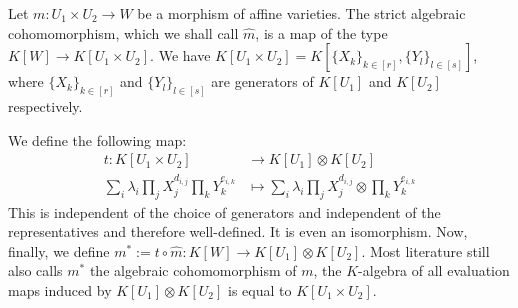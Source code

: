 \begin{definition}\label{coh}

  Let $m \colon U_1 \times U_2 \longrightarrow W$ be a morphism of affine varieties.
  The strict algebraic cohomomorphism, which we shall call $\hat{m}$, is a map of the type $K[W] \longrightarrow K[U_1 \times U_2]$.
  We have $ K[U_1 \times U_2] = K[\{X_k\}_{k\in[r]},\{Y_l\}_{l\in[s]}]$, where $\{X_k\}_{k\in[r]}$ and $\{Y_l\}_{l\in[s]}$ are generators of $K[U_1]$ and $K[U_2]$ respectively.
  
  
  We define the following map:
    \begin{equation}
    \begin{aligned}
      t \colon K[U_1 \times U_2]
      & \longrightarrow K[U_1] \otimes K[U_2]\\
      \sum_i \lambda_i \prod_j X_{j}^{d_{i,j}} \prod_k Y_{k}^{e_{i,k}} &\longmapsto \sum_i \lambda_i \prod_j X_{j}^{d_{i,j}} \otimes \prod_k Y_{k}^{e_{i,k}}
    \end{aligned}
  \end{equation}
  This is independent of the choice of generators and independent of the representatives and therefore well-defined.
  It is even an isomorphism.
  Now, finally, we define $m^\ast := t \circ \hat{m} : K[W] \longrightarrow K[U_1] \otimes K[U_2]$.
  Most literature still also calls $m^\ast$ the algebraic cohomomorphism of $m$, the $K$-algebra of all evaluation maps induced by $K[U_1] \otimes K[U_2]$ is equal to $K[U_1 \times U_2]$.
\end{definition}

